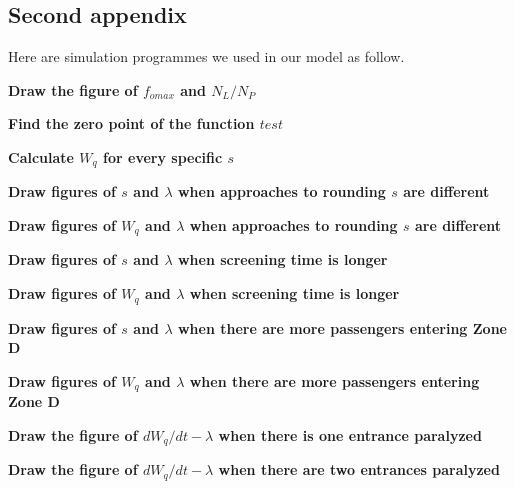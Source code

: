 \documentclass{mcmthesis}
\begin{document}
\begin{appendices}
  

\section{Second appendix}
Here are simulation programmes we used in our model as follow.

\noindent \textbf{\textcolor[rgb]{0.98,0.00,0.00}{Draw the figure of $f_{omax}$ and $N_L/N_P$}}

\textbf{\textcolor[rgb]{0.98,0.00,0.00}{Find the zero point of the function $test$ }}

\textbf{\textcolor[rgb]{0.98,0.00,0.00}{Calculate $W_q$ for every specific $s$}}

\textbf{\textcolor[rgb]{0.98,0.00,0.00}{Draw figures of $s$ and $\lambda$ when approaches to rounding $s$ are different}}

\textbf{\textcolor[rgb]{0.98,0.00,0.00}{Draw figures of $W_q$ and $\lambda$ when approaches to rounding $s$ are different}}

\textbf{\textcolor[rgb]{0.98,0.00,0.00}{Draw figures of $s$ and $\lambda$ when screening time is longer}}

\textbf{\textcolor[rgb]{0.98,0.00,0.00}{Draw figures of $W_q$ and $\lambda$ when screening time is longer}}

\textbf{\textcolor[rgb]{0.98,0.00,0.00}{Draw figures of $s$ and $\lambda$ when there are more passengers entering Zone D}}

\textbf{\textcolor[rgb]{0.98,0.00,0.00}{Draw figures of $W_q$ and $\lambda$ when there are more passengers entering Zone D}}

\noindent \textbf{\textcolor[rgb]{0.98,0.00,0.00}{Draw the figure of $dW_q/dt-\lambda$ when there is one entrance paralyzed}}

\textbf{\textcolor[rgb]{0.98,0.00,0.00}{Draw the figure of $dW_q/dt-\lambda$ when there are two entrances paralyzed }}

\end{appendices}
\end{document}
